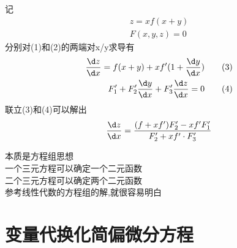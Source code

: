 \documentclass[12pt, a4paper, oneside, UTF8]{ctexbook}
\begin{document}
\begin{enumerate}[label=\arabic*.,start=6]
    \begin{solution}
    记
    \begin{align}
        z=xf(x+y) \tag{1} \\
        F(x,y,z)=0 \tag{2}
    \end{align}
    分别对(1)和(2)的两端对x/y求导有 
    \begin{align*}
        \frac{\d z}{\d x} = f(x+y) + xf'(1+\frac{\d y}{\d x}) \tag{3} \\
        F'_1 + F'_2\frac{\d y}{\d x} + F'_3\frac{\d z}{\d x} = 0 \tag{4}
    \end{align*}
    联立(3)和(4)可以解出 
    $$
    \frac{\d z}{\d x} = \frac{(f+xf')F'_2-xf'F'_1}{F'_2+xf'\cdot F'_3}
    $$
    \end{solution}

    \begin{tcolorbox}[title=多元函数组确认函数的情况]
        本质是方程组思想 \\
        {\color{red}一个三元方程可以确定一个二元函数} \\
        {\color{red}二个三元方程可以确定两个二元函数} \\
        参考线性代数的方程组的解,就很容易明白
    \end{tcolorbox}
\end{enumerate}

\section{变量代换化简偏微分方程}
\end{document}
